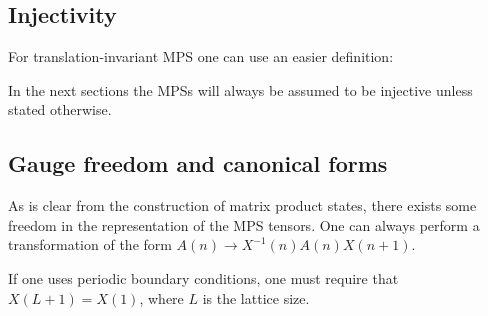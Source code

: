 \subsection{Injectivity}

    For translation-invariant MPS one can use an easier definition:

    In the next sections the MPSs will always be assumed to be injective unless stated otherwise.

\subsection{Gauge freedom and canonical forms}

    \begin{property}
        As is clear from the construction of matrix product states, there exists some freedom in the representation of the MPS tensors. One can always perform a transformation of the form $A(n)\rightarrow X^{-1}(n)A(n)X(n+1)$.
    \end{property}
    \begin{remark}
        If one uses periodic boundary conditions, one must require that $X(L+1)=X(1)$, where $L$ is the lattice size.
    \end{remark}

